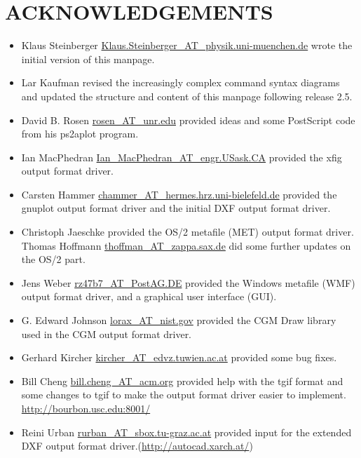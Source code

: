 \documentclass[english,a4paper]{article}
\let\URL\url \let\Email\url \let\File\url
\begin{document}
\section{ACKNOWLEDGEMENTS}

\begin{itemize}\setlength{\itemsep}{0cm}

  \item Klaus Steinberger \Email{Klaus.Steinberger_AT_physik.uni-muenchen.de}
     wrote the initial version of this manpage.

  \item Lar Kaufman revised the increasingly complex
     command syntax diagrams and updated the structure and content of this
     manpage following release 2.5. 

  \item David B. Rosen \Email{rosen_AT_unr.edu} provided ideas and some PostScript
     code from his ps2aplot program.

  \item Ian MacPhedran \Email{Ian_MacPhedran_AT_engr.USask.CA} provided the xfig
     output format driver.

  \item Carsten Hammer \Email{chammer_AT_hermes.hrz.uni-bielefeld.de} provided the
     gnuplot output format driver and the initial DXF output format driver.

  \item Christoph Jaeschke provided the OS/2 metafile (MET) output format driver. 
  Thomas Hoffmann \Email{thoffman_AT_zappa.sax.de} did some further updates on the OS/2 part.

  \item Jens Weber \Email{rz47b7_AT_PostAG.DE} provided the Windows metafile (WMF)
     output format driver, and a graphical user interface (GUI).

  \item G. Edward Johnson \Email{lorax_AT_nist.gov} provided the CGM Draw library
     used in the CGM output format driver.

  \item Gerhard Kircher \Email{kircher_AT_edvz.tuwien.ac.at} provided some bug
     fixes.

  \item Bill Cheng \Email{bill.cheng_AT_acm.org} provided help with the tgif
     format and some changes to tgif to make the output format driver easier to implement.
     \URL{http://bourbon.usc.edu:8001/}

  \item Reini Urban \Email{rurban_AT_sbox.tu-graz.ac.at} provided input for the
     extended DXF output format driver.(\URL{http://autocad.xarch.at/})


\end{itemize}
\end{document}
